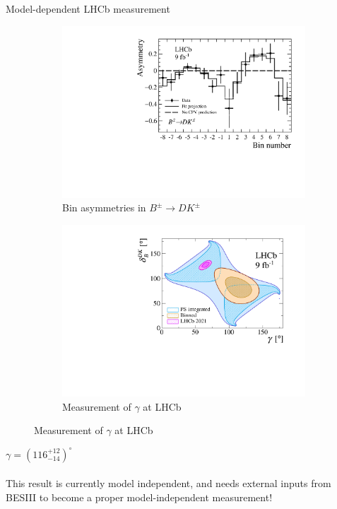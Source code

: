 \documentclass{beamer}
\begin{document}
\begin{frame}{Model-dependent LHCb measurement}
  \begin{figure}
    \centering
    \begin{subfigure}{0.50\textwidth}
      \centering
      \includegraphics[width=1.0\textwidth]{Plots/BinAsymmetries_dk.pdf}
      \caption{Bin asymmetries in $B^\pm\to DK^\pm$}
    \end{subfigure}%
    \begin{subfigure}{0.50\textwidth}
      \centering
      \includegraphics[width=1.0\textwidth,trim={0 0.15cm 0 0},clip=true]{Plots/gammacharm_lhcb_KKpipi_GLW_KKpipi_GGSZ_lhcb_2020_beauty_and_charm_g_d_dk.pdf}
      \caption{Measurement of $\gamma$ at LHCb}
    \end{subfigure}
  \end{figure}
  \begin{center}
    $\gamma = (116^{+12}_{-14})^\circ$\\~\\
    This result is currently model independent, and needs external inputs from BESIII to become a proper model-independent measurement!
  \end{center}
\end{frame}
\end{document}
